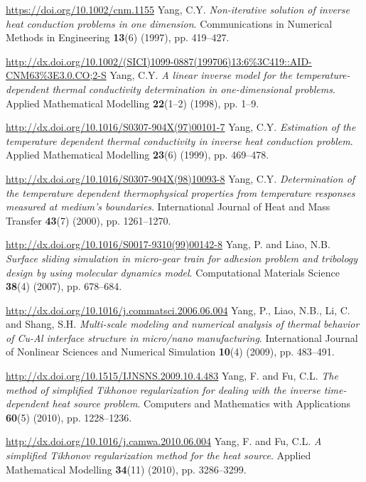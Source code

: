 \begin{thebibliography}{301}
\url{ https://doi.org/10.1002/cnm.1155}
%
%
 Yang, C.Y. {\it Non-iterative solution of inverse heat conduction problems in one dimension}. Communications in Numerical Methods in Engineering {\bf 13}(6) (1997), pp. 419--427.

\url{http://dx.doi.org/10.1002/(SICI)1099-0887(199706)13:6\%3C419::AID-CNM63\%3E3.0.CO;2-S}
%
%
 Yang, C.Y. {\it A linear inverse model for the temperature-dependent thermal conductivity determination in one-dimensional problems}. Applied Mathematical Modelling {\bf 22}(1--2) (1998), pp. 1--9.

\url{http://dx.doi.org/10.1016/S0307-904X(97)00101-7}
%
%
 Yang, C.Y. {\it Estimation of the temperature dependent thermal conductivity in inverse heat conduction problem}. Applied Mathematical Modelling {\bf 23}(6) (1999), pp. 469--478.

\url{http://dx.doi.org/10.1016/S0307-904X(98)10093-8}
%
%
 Yang, C.Y. {\it Determination of the temperature dependent thermophysical properties from temperature responses measured at medium's boundaries}. International Journal of Heat and Mass Transfer {\bf 43}(7) (2000), pp. 1261--1270.

\url{http://dx.doi.org/10.1016/S0017-9310(99)00142-8}
%
%
 Yang, P. and Liao, N.B. {\it Surface sliding simulation in micro-gear train for adhesion problem and tribology design by using molecular dynamics model}. Computational Materials Science {\bf 38}(4) (2007), pp. 678--684.

\url{http://dx.doi.org/10.1016/j.commatsci.2006.06.004}
%
%
 Yang, P., Liao, N.B., Li, C. and Shang, S.H. {\it Multi-scale modeling and numerical analysis of thermal behavior of Cu-Al interface structure in micro/nano manufacturing}. International Journal of Nonlinear Sciences and Numerical Simulation {\bf 10}(4) (2009), pp. 483--491.

\url{http://dx.doi.org/10.1515/IJNSNS.2009.10.4.483}
%
%
 Yang, F. and Fu, C.L. {\it The method of simplified Tikhonov regularization for dealing with the inverse time-dependent heat source problem}. Computers and Mathematics with Applications {\bf 60}(5) (2010), pp. 1228--1236.

\url{http://dx.doi.org/10.1016/j.camwa.2010.06.004}
%
%
 Yang, F. and Fu, C.L. {\it A simplified Tikhonov regularization method for the heat source}. Applied Mathematical Modelling {\bf 34}(11) (2010), pp. 3286--3299.


\end{thebibliography}
